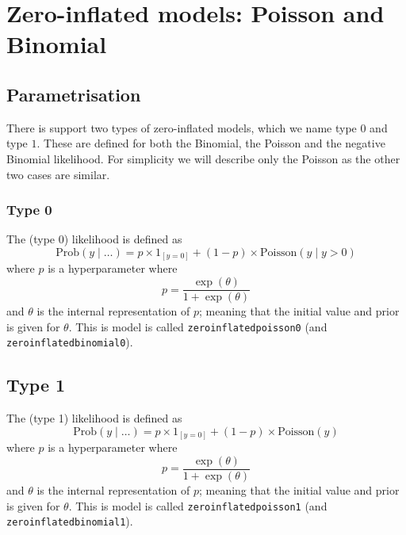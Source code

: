 \documentclass[a4paper,11pt]{article}
\begin{document}
\section*{Zero-inflated models: Poisson and Binomial}

\subsection*{Parametrisation}

There is support two types of zero-inflated models, which we name type
$0$ and type $1$. These are defined for both the Binomial, the Poisson
and the negative Binomial likelihood. For simplicity we will describe
only the Poisson as the other two cases are similar.

\subsubsection*{Type 0}

The (type 0) likelihood is defined as
\begin{displaymath}
    \text{Prob}(y \mid \ldots ) = p \times 1_{[y=0]} +
    (1-p)\times \text{Poisson}(y \mid y > 0)
\end{displaymath}
where $p$ is a hyperparameter where
\begin{displaymath}
    p = \frac{\exp(\theta)}{1+\exp(\theta)}
\end{displaymath}
and $\theta$ is the internal representation of $p$; meaning that the
initial value and prior is given for $\theta$. This is model is called
\texttt{zeroinflatedpoisson0} (and \texttt{zeroinflatedbinomial0}).

\subsection*{Type 1}

The (type 1) likelihood is defined as
\begin{displaymath}
    \text{Prob}(y \mid \ldots ) = p \times 1_{[y=0]} +
    (1-p)\times \text{Poisson}(y)
\end{displaymath}
where $p$ is a hyperparameter where
\begin{displaymath}
    p = \frac{\exp(\theta)}{1+\exp(\theta)}
\end{displaymath}
and $\theta$ is the internal representation of $p$; meaning that the
initial value and prior is given for $\theta$. This is model is called
\texttt{zeroinflatedpoisson1} (and \texttt{zeroinflatedbinomial1}).
\end{document}
